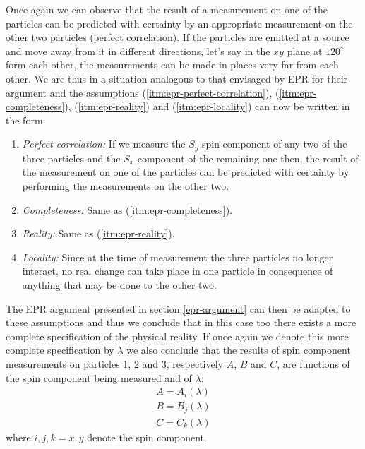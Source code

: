 Once again we can observe that the result of a measurement on one of the particles can be predicted with certainty by an appropriate measurement on the other two particles (perfect correlation). If the particles are emitted at a source and move away from it in different directions, let's say in the $xy$ plane at $120^{\circ}$ form each other, the measurements can be made in places very far from each other. We are thus in a situation analogous to that envisaged by EPR for their argument and the assumptions (\ref{itm:epr-perfect-correlation}), (\ref{itm:epr-completeness}), (\ref{itm:epr-reality}) and (\ref{itm:epr-locality}) can now be written in the form:%

\begin{enumerate}[label=(\alph*$'$)]
\item \label{itm:epr-perfect-correlation'} \textit{Perfect correlation:} If we measure the $S_y$ spin component of any two of the three particles and the $S_x$ component of the remaining one then, the result of the measurement on one of the particles can be predicted with certainty by performing the measurements on the other two.
\item \label{itm:epr-completeness'} \textit{Completeness:} Same as (\ref{itm:epr-completeness}).
\item \label{itm:epr-reality'} \textit{Reality:} Same as (\ref{itm:epr-reality}).
\item \label{itm:epr-locality'} \textit{Locality:} Since at the time of measurement the three particles no longer interact, no real change can take place in one particle in consequence of anything that may be done to the other two.
\end{enumerate}
The EPR argument presented in section \ref{epr-argument} can then be adapted to these assumptions and thus we conclude that in this case too there exists a more complete specification of the physical reality. If once again we denote this more complete specification by $\lambda$ we also conclude that the results of spin component measurements on particles 1, 2 and 3, respectively $A$, $B$ and $C$, are functions of the spin component being measured and of $\lambda$:%
\begin{equation}
  \begin{split}
      A = A_i(\lambda)\\
      B = B_j(\lambda)\\
      C = C_k(\lambda)
  \end{split}
\end{equation}
where $i, j, k = x, y$ denote the spin component.%

